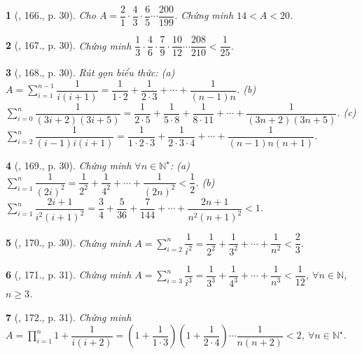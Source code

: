 \documentclass{article}
\newtheorem{baitoan}{}
\begin{document}
\begin{baitoan}[\cite{Binh_Toan_8_tap_1}, 166., p. 30]
	Cho $A = \dfrac{2}{1}\cdot\dfrac{4}{3}\cdot\dfrac{6}{5}\cdots\dfrac{200}{199}$. Chứng minh $14 < A < 20$.
\end{baitoan}

\begin{baitoan}[\cite{Binh_Toan_8_tap_1}, 167., p. 30]
	Chứng minh $\dfrac{1}{3}\cdot\dfrac{4}{6}\cdot\dfrac{7}{9}\cdot\dfrac{10}{12}\cdots\dfrac{208}{210} < \dfrac{1}{25}$.
\end{baitoan}

\begin{baitoan}[\cite{Binh_Toan_8_tap_1}, 168., p. 30]
	Rút gọn biểu thức: (a) $A = \sum_{i=1}^{n-1} \dfrac{1}{i(i + 1)} = \dfrac{1}{1\cdot2} + \dfrac{1}{2\cdot3} + \cdots + \dfrac{1}{(n - 1)n}$. (b) $\sum_{i=0}^n \dfrac{1}{(3i + 2)(3i + 5)} = \dfrac{1}{2\cdot5} + \dfrac{1}{5\cdot8} + \dfrac{1}{8\cdot11} + \cdots + \dfrac{1}{(3n + 2)(3n + 5)}$. (c) $\sum_{i=2}^n \dfrac{1}{(i - 1)i(i + 1)} = \dfrac{1}{1\cdot2\cdot3} + \dfrac{1}{2\cdot3\cdot4} + \cdots + \dfrac{1}{(n - 1)n(n + 1)}$.
\end{baitoan}

\begin{baitoan}[\cite{Binh_Toan_8_tap_1}, 169., p. 30]
	Chứng minh $\forall n\in\mathbb{N}^\star$: (a) $\sum_{i=1}^n \dfrac{1}{(2i)^2} = \dfrac{1}{2^2} + \dfrac{1}{4^2} + \cdots + \dfrac{1}{(2n)^2} < \dfrac{1}{2}$. (b) $\sum_{i=1}^n \dfrac{2i + 1}{i^2(i + 1)^2} = \dfrac{3}{4} + \dfrac{5}{36} + \dfrac{7}{144} + \cdots + \dfrac{2n + 1}{n^2(n + 1)^2} < 1$.
\end{baitoan}

\begin{baitoan}[\cite{Binh_Toan_8_tap_1}, 170., p. 30]
	Chứng minh $A = \sum_{i=2}^n \dfrac{1}{i^2} = \dfrac{1}{2^2} + \dfrac{1}{3^2} + \cdots + \dfrac{1}{n^2} < \dfrac{2}{3}$.
\end{baitoan}

\begin{baitoan}[\cite{Binh_Toan_8_tap_1}, 171., p. 31]
	Chứng minh $A = \sum_{i=3}^n \dfrac{1}{i^3} = \dfrac{1}{3^3} + \dfrac{1}{4^3} + \cdots + \dfrac{1}{n^3} < \dfrac{1}{12}$, $\forall n\in\mathbb{N}$, $n\ge3$.
\end{baitoan}

\begin{baitoan}[\cite{Binh_Toan_8_tap_1}, 172., p. 31]
	Chứng minh $A = \prod_{i=1}^n 1 + \dfrac{1}{i(i + 2)} = \left(1 + \dfrac{1}{1\cdot3}\right)\left(1 + \dfrac{1}{2\cdot4}\right)\cdots\dfrac{1}{n(n + 2)} < 2$, $\forall n\in\mathbb{N}^\star$.
\end{baitoan}
\end{document}
